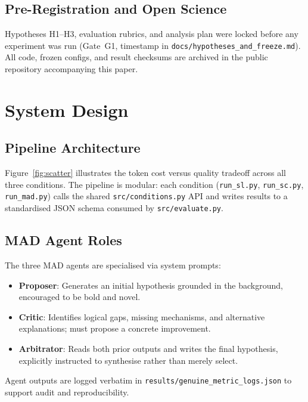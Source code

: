 \subsection{Pre-Registration and Open Science}

Hypotheses H1--H3, evaluation rubrics, and analysis plan were locked before any
experiment was run (Gate~G1, timestamp in \texttt{docs/hypotheses\_and\_freeze.md}).
All code, frozen configs, and result checksums are archived in the public
repository accompanying this paper.

\section{System Design}
\label{sec:design}

\subsection{Pipeline Architecture}

Figure~\ref{fig:scatter} illustrates the token cost versus quality tradeoff
across all three conditions.  The pipeline is modular: each condition
(\texttt{run\_sl.py}, \texttt{run\_sc.py}, \texttt{run\_mad.py}) calls the
shared \texttt{src/conditions.py} API and writes results to a standardised JSON
schema consumed by \texttt{src/evaluate.py}.

\subsection{MAD Agent Roles}

The three MAD agents are specialised via system prompts:
\begin{itemize}
  \item \textbf{Proposer}: Generates an initial hypothesis grounded in the
    background, encouraged to be bold and novel.
  \item \textbf{Critic}: Identifies logical gaps, missing mechanisms, and
    alternative explanations; must propose a concrete improvement.
  \item \textbf{Arbitrator}: Reads both prior outputs and writes the final
    hypothesis, explicitly instructed to synthesise rather than merely select.
\end{itemize}
Agent outputs are logged verbatim in \texttt{results/genuine\_metric\_logs.json}
to support audit and reproducibility.

